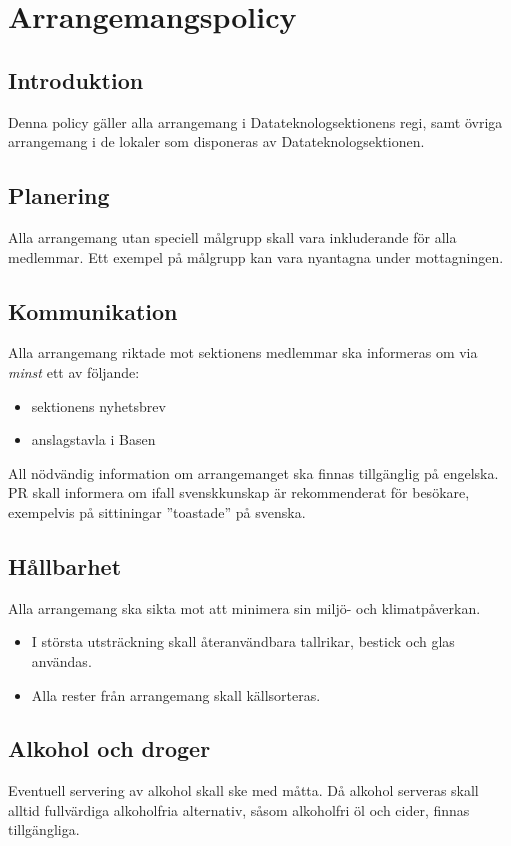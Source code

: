 \section{Arrangemangspolicy}
\subsection{Introduktion}
Denna policy gäller alla arrangemang i Datateknologsektionens regi, samt övriga arrangemang i de lokaler som disponeras av Datateknologsektionen.

\subsection{Planering}
Alla arrangemang utan speciell målgrupp skall vara inkluderande för alla medlemmar. Ett exempel på målgrupp kan vara nyantagna under mottagningen.

\subsection{Kommunikation}
Alla arrangemang riktade mot sektionens medlemmar ska informeras om via \emph{minst} ett av följande:
\begin{itemize}
    \item sektionens nyhetsbrev
    \item anslagstavla i Basen
\end{itemize}
All nödvändig information om arrangemanget ska finnas tillgänglig på engelska. PR skall informera om ifall svenskkunskap är rekommenderat för besökare, exempelvis på sittiningar ''toastade'' på svenska.

\subsection{Hållbarhet}
Alla arrangemang ska sikta mot att minimera sin miljö- och klimatpåverkan.

\begin{itemize}
    \item I största utsträckning skall återanvändbara tallrikar, bestick och glas användas.
    \item Alla rester från arrangemang skall källsorteras.
\end{itemize}

\subsection{Alkohol och droger}
Eventuell servering av alkohol skall ske med måtta. Då alkohol serveras skall alltid fullvärdiga alkoholfria alternativ, såsom alkoholfri öl och cider, finnas tillgängliga.
